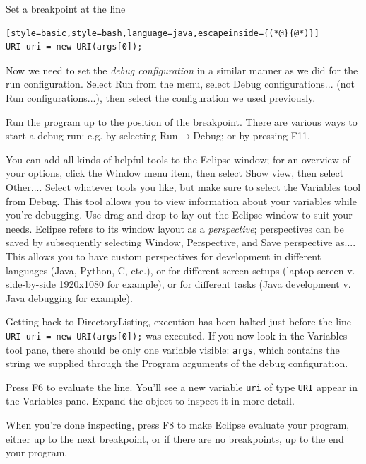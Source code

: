 \documentclass[12pt, a4paper, twoside, openany, titlepage]{book}
\begin{document}
Set a breakpoint at the line
\begin{lstlisting}[style=basic,style=bash,language=java,escapeinside={(*@}{@*)}]
URI uri = new URI(args[0]);
\end{lstlisting}

Now we need to set the \textit{debug configuration} in a similar manner as we did for the run configuration. Select \textsf{Run} from the menu, select \textsf{Debug configurations...} (not \textsf{Run configurations...}), then select the configuration we used previously.

Run the program up to the position of the breakpoint. There are various ways to start a debug run: e.g. by selecting \textsf{Run}$\rightarrow$\textsf{Debug}; or by pressing \textsf{F11}.

You can add all kinds of helpful tools to the Eclipse window; for an overview of your options, click the \textsf{Window} menu item, then select \textsf{Show view}, then select \textsf{Other...}. Select whatever tools you like, but make sure to select the \textsf{Variables} tool from \textsf{Debug}. This tool allows you to view information about your variables while you're debugging. Use drag and drop to lay out the Eclipse window to suit your needs. Eclipse refers to its window layout as a \textit{perspective}; perspectives can be saved by subsequently selecting \textsf{Window}, \textsf{Perspective}, and \textsf{Save perspective as...}. This allows you to have custom perspectives for development in different languages (Java, Python, C, etc.), or for different screen setups (laptop screen v. side-by-side 1920x1080 for example), or for different tasks (Java development v. Java debugging for example).

Getting back to \textsf{DirectoryListing}, execution has been halted just before the line \texttt{URI uri = new URI(args[0]);} was executed. If you now look in the \textsf{Variables} tool pane, there should be only one variable visible: \texttt{args}, which contains the string we supplied through the \textsf{Program arguments} of the debug configuration.

Press \textsf{F6} to evaluate the line. You'll see a new variable \texttt{uri} of type \texttt{URI} appear in the \textsf{Variables} pane. Expand the object to inspect it in more detail.

When you're done inspecting, press \textsf{F8} to make Eclipse evaluate your program, either up to the next breakpoint, or if there are no breakpoints, up to the end your program.
\end{document}
